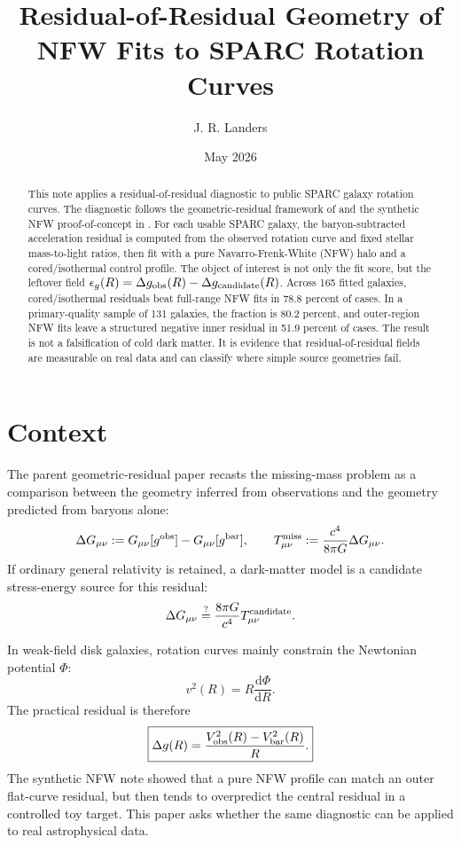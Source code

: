 \documentclass[10pt]{article}
\title{Residual-of-Residual Geometry of NFW Fits to SPARC Rotation Curves}
\author{J. R. Landers}
\date{\vspace{-0.6em}May 2026}
\newcommand{\dd}{\mathrm{d}}
\newcommand{\cG}{\frac{8\pi G}{c^4}}
\newcommand{\Gobs}{G_{\mu\nu}[g^{\rm obs}]}
\newcommand{\Gbar}{G_{\mu\nu}[g^{\rm bar}]}
\newcommand{\Tmiss}{T^{\rm miss}_{\mu\nu}}
\begin{document}
\maketitle
\vspace{-1.8em}

\begin{abstract}
This note applies a residual-of-residual diagnostic to public SPARC galaxy
rotation curves. The diagnostic follows the geometric-residual framework of
\citet{Landers2026a} and the synthetic NFW proof-of-concept in
\citet{Landers2026b}. For each usable SPARC galaxy, the baryon-subtracted
acceleration residual is computed from the observed rotation curve and fixed
stellar mass-to-light ratios, then fit with a pure Navarro-Frenk-White (NFW)
halo and a cored/isothermal control profile. The object of interest is not only
the fit score, but the leftover field
$\epsilon_g(R)=\Delta g_{\rm obs}(R)-\Delta g_{\rm candidate}(R)$.
Across 165 fitted galaxies, cored/isothermal residuals beat full-range NFW
fits in 78.8 percent of cases. In a primary-quality sample of 131 galaxies, the
fraction is 80.2 percent, and outer-region NFW fits leave a structured negative
inner residual in 51.9 percent of cases. The result is not a falsification of
cold dark matter. It is evidence that residual-of-residual fields are
measurable on real data and can classify where simple source geometries fail.
\end{abstract}

\section{Context}

The parent geometric-residual paper \citep{Landers2026a} recasts the
missing-mass problem as a comparison between the geometry inferred from
observations and the geometry predicted from baryons alone:
\begin{equation}
\Delta G_{\mu\nu}
:=
\Gobs-\Gbar,
\qquad
\Tmiss
:=
\frac{c^4}{8\pi G}\Delta G_{\mu\nu}.
\end{equation}
If ordinary general relativity is retained, a dark-matter model is a candidate
stress-energy source for this residual:
\begin{equation}
\Delta G_{\mu\nu}
\stackrel{?}{=}
\cG T_{\mu\nu}^{\rm candidate}.
\end{equation}

In weak-field disk galaxies, rotation curves mainly constrain the Newtonian
potential $\Phi$:
\begin{equation}
v^2(R)=R\frac{\dd\Phi}{\dd R}.
\end{equation}
The practical residual is therefore
\begin{equation}
\boxed{
\Delta g(R)
=
\frac{V_{\rm obs}^2(R)-V_{\rm bar}^2(R)}{R}.
}
\end{equation}
The synthetic NFW note \citep{Landers2026b} showed that a pure NFW profile can
match an outer flat-curve residual, but then tends to overpredict the central
residual in a controlled toy target. This paper asks whether the same
diagnostic can be applied to real astrophysical data.
\end{document}
